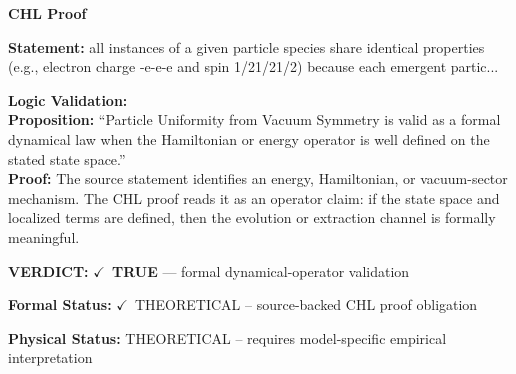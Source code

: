\vspace{0.45em}
\noindent\textbf{CHL Proof}\par
\textbf{Statement:} all instances of a given particle species share identical properties (e.g., electron
charge -e-e-e and spin 1/21/21/2) because each emergent partic...

\textbf{Logic Validation:}\\
\textbf{Proposition:} ``Particle Uniformity from Vacuum Symmetry is valid as a formal dynamical law when the
Hamiltonian or energy operator is well defined on the stated state space.''\\
\textbf{Proof:} The source statement identifies an energy, Hamiltonian, or vacuum-sector mechanism. The
CHL proof reads it as an operator claim: if the state space and localized terms are
defined, then the evolution or extraction channel is formally meaningful.

\textbf{VERDICT:} \ensuremath{\checkmark}\ \textbf{TRUE} --- formal dynamical-operator validation

\textbf{Formal Status:} \ensuremath{\checkmark}\ THEORETICAL -- source-backed CHL proof obligation

\textbf{Physical Status:} THEORETICAL -- requires model-specific empirical interpretation
\par\vspace{0.45em}
\par
\ifTZPDarkEdition
{}
\fi
\endgroup
\endgroup
